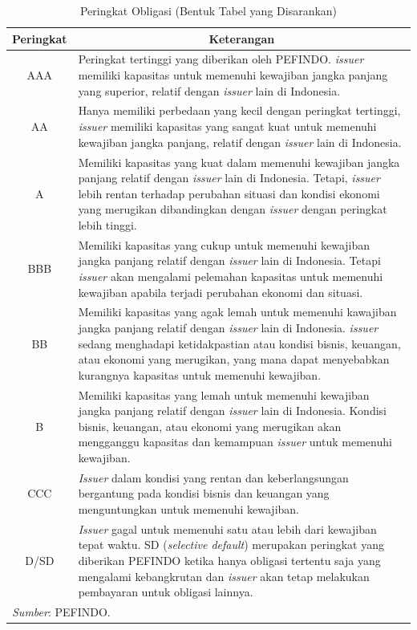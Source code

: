 \begin{table}[htbp]
  \centering
  \caption{Peringkat Obligasi (Bentuk Tabel yang Disarankan)}\label{tab:2-1}
    \begin{tabular}{c p{}}
\toprule
    Peringkat & \multicolumn{1}{c}{Keterangan} \\
\midrule
    AAA   & Peringkat tertinggi yang diberikan oleh PEFINDO. \textit{issuer} memiliki kapasitas untuk memenuhi kewajiban jangka panjang yang superior, relatif dengan \textit{issuer} lain di Indonesia. \\

    AA    & Hanya memiliki perbedaan yang kecil dengan peringkat tertinggi, \textit{issuer} memiliki kapasitas yang sangat kuat untuk memenuhi kewajiban jangka panjang, relatif dengan \textit{issuer} lain di Indonesia. \\

    A     & Memiliki kapasitas yang kuat dalam memenuhi kewajiban jangka panjang relatif dengan \textit{issuer} lain di Indonesia. Tetapi, \textit{issuer} lebih rentan terhadap perubahan situasi dan kondisi ekonomi yang merugikan dibandingkan dengan \textit{issuer} dengan peringkat lebih tinggi. \\

    BBB   & Memiliki kapasitas yang cukup untuk memenuhi kewajiban jangka panjang relatif dengan \textit{issuer} lain di Indonesia. Tetapi \textit{issuer} akan mengalami pelemahan kapasitas untuk memenuhi kewajiban apabila terjadi perubahan ekonomi dan situasi. \\

    BB    & Memiliki kapasitas yang agak lemah untuk memenuhi kawajiban jangka panjang relatif dengan \textit{issuer} lain di Indonesia. \textit{issuer} sedang menghadapi ketidakpastian atau kondisi bisnis, keuangan, atau ekonomi yang merugikan, yang mana dapat menyebabkan kurangnya kapasitas untuk memenuhi kewajiban. \\

    B     & Memiliki kapasitas yang lemah untuk memenuhi kewajiban jangka panjang relatif dengan \textit{issuer} lain di Indonesia. Kondisi bisnis, keuangan, atau ekonomi yang merugikan akan mengganggu kapasitas dan kemampuan \textit{issuer} untuk memenuhi kewajiban. \\

    CCC   & \textit{Issuer} dalam kondisi yang rentan dan keberlangsungan bergantung pada kondisi bisnis dan keuangan yang menguntungkan untuk memenuhi kewajiban. \\

    D/SD  & \textit{Issuer} gagal untuk memenuhi satu atau lebih dari kewajiban tepat waktu. SD (\textit{selective default}) merupakan peringkat yang diberikan PEFINDO ketika hanya obligasi tertentu saja yang mengalami kebangkrutan dan \textit{issuer} akan tetap melakukan pembayaran untuk obligasi lainnya. \\
    \bottomrule
\multicolumn{2}{l}{{\small \emph{Sumber}: PEFINDO.}}    
    \end{tabular}%
  \label{tab:addlabel}%
\end{table}%

